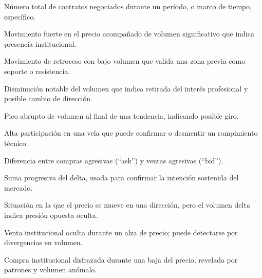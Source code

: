 \begin{description}[style=nextline]
  \sloppy
  \item[Volumen] N\'umero total de contratos negociados durante un per\'iodo, o marco de tiempo, espec\'ifico.
  \item[Intenci\'on] Movimiento fuerte en el precio acompa\~nado de volumen significativo que indica presencia institucional.
  \item[Testeo] Movimiento de retroceso con bajo volumen que valida una zona previa como soporte o resistencia.
  \item[Secado] Disminuci\'on notable del volumen que indica retirada del inter\'es profesional y posible cambio de direcci\'on.
  \item[Volumen de parada] Pico abrupto de volumen al final de una tendencia, indicando posible giro.
  \item[Volumen m\'aximo] Alta participaci\'on en una vela que puede confirmar o desmentir un rompimiento t\'ecnico.
  \item[Volumen delta] Diferencia entre compras agresivas (``ask'') y ventas agresivas (``bid'').
  \item[Delta acumulado] Suma progresiva del delta, usada para confirmar la intenci\'on sostenida del mercado.
  \item[Absorci\'on] Situaci\'on en la que el precio se mueve en una direcci\'on, pero el volumen delta indica presi\'on opuesta oculta.
  \item[Distribuci\'on] Venta institucional oculta durante un alza de precio; puede detectarse por divergencias en volumen.
  \item[Acumulaci\'on] Compra institucional disfrazada durante una baja del precio; revelada por patrones y volumen an\'omalo.
\end{description}

